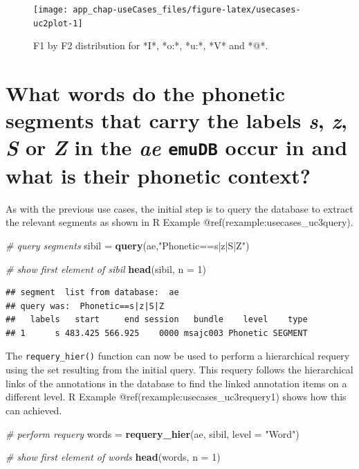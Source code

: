 \documentclass[]{book}
\newenvironment{Shaded}{\begin{snugshade}}{\end{snugshade}}
\newcommand{\CommentTok}[1]{\textcolor[rgb]{0.56,0.35,0.01}{\textit{#1}}}
\newcommand{\DataTypeTok}[1]{\textcolor[rgb]{0.13,0.29,0.53}{#1}}
\newcommand{\DecValTok}[1]{\textcolor[rgb]{0.00,0.00,0.81}{#1}}
\newcommand{\KeywordTok}[1]{\textcolor[rgb]{0.13,0.29,0.53}{\textbf{#1}}}
\newcommand{\NormalTok}[1]{#1}
\newcommand{\StringTok}[1]{\textcolor[rgb]{0.31,0.60,0.02}{#1}}
\theoremstyle{definition}
\theoremstyle{definition}
\theoremstyle{definition}
\theoremstyle{remark}
\begin{document}
\begin{figure}

{\centering \texttt{[image: app\_chap-useCases\_files/figure-latex/usecases-uc2plot-1]} 

}

\caption{F1 by F2 distribution for *I*, *o:*, *u:*, *V* and *@*.}\label{fig:usecases-uc2plot}
\end{figure}

\hypertarget{sec:app-chap-useCases-q3}{%
\section{\texorpdfstring{What words do the phonetic segments that carry
the labels \emph{s}, \emph{z}, \emph{S} or \emph{Z} in the \emph{ae}
\texttt{emuDB} occur in and what is their phonetic
context?}{What words do the phonetic segments that carry the labels s, z, S or Z in the ae emuDB occur in and what is their phonetic context?}}\label{sec:app-chap-useCases-q3}}

As with the previous use cases, the initial step is to query the
database to extract the relevant segments as shown in R Example
@ref(rexample:usecases\_uc3query).

\begin{Shaded}
\begin{Highlighting}[]
\CommentTok{# query segments}
\NormalTok{sibil =}\StringTok{ }\KeywordTok{query}\NormalTok{(ae,}\StringTok{"Phonetic==s|z|S|Z"}\NormalTok{)}

\CommentTok{# show first element of sibil}
\KeywordTok{head}\NormalTok{(sibil, }\DataTypeTok{n =} \DecValTok{1}\NormalTok{)}
\end{Highlighting}
\end{Shaded}

\begin{verbatim}
## segment  list from database:  ae 
## query was:  Phonetic==s|z|S|Z 
##   labels   start     end session   bundle    level    type
## 1      s 483.425 566.925    0000 msajc003 Phonetic SEGMENT
\end{verbatim}

The \texttt{requery\_hier()} function can now be used to perform a
hierarchical requery using the set resulting from the initial query.
This requery follows the hierarchical links of the annotations in the
database to find the linked annotation items on a different level. R
Example @ref(rexample:usecases\_uc3requery1) shows how this can
achieved.

\begin{Shaded}
\begin{Highlighting}[]
\CommentTok{# perform requery}
\NormalTok{words =}\StringTok{ }\KeywordTok{requery_hier}\NormalTok{(ae, sibil, }\DataTypeTok{level =} \StringTok{"Word"}\NormalTok{)}

\CommentTok{# show first element of words}
\KeywordTok{head}\NormalTok{(words, }\DataTypeTok{n =} \DecValTok{1}\NormalTok{)}
\end{Highlighting}
\end{Shaded}
\end{document}
